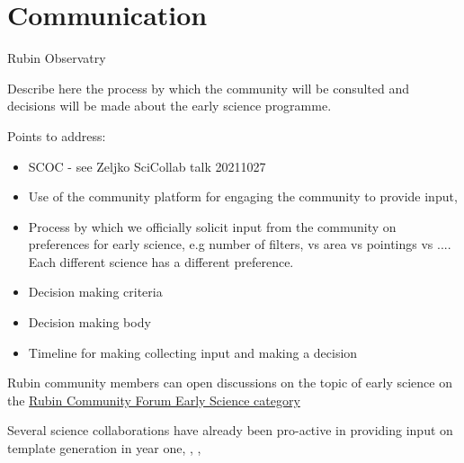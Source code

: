 
\section{Communication}

Rubin Observatry 

Describe here the process by which the community will be consulted and decisions will be made about the early science programme. 

Points to address:
\begin{itemize}
\item SCOC - see Zeljko SciCollab talk 20211027
\item Use of the community platform for engaging the community to provide input,
\item Process by which we officially solicit  input from the community on preferences for early science, e.g number of filters, vs area vs pointings vs .... Each different science has a different preference. 
\item Decision making criteria 
\item Decision making body
\item Timeline for making collecting input and making a decision
\end{itemize}

Rubin community members can open discussions on the topic of early science on the \href{https://community.lsst.org/t/about-the-early-science-category/5775}{Rubin Community Forum Early Science category}

Several science collaborations have already been pro-active in providing input on template generation in year one, , , 
